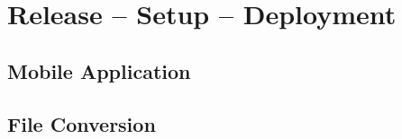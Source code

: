
\chapter{Release -- Setup -- Deployment}



\section{Mobile Application}
\section{File Conversion}

%
%
%
%
%
%
%
%
